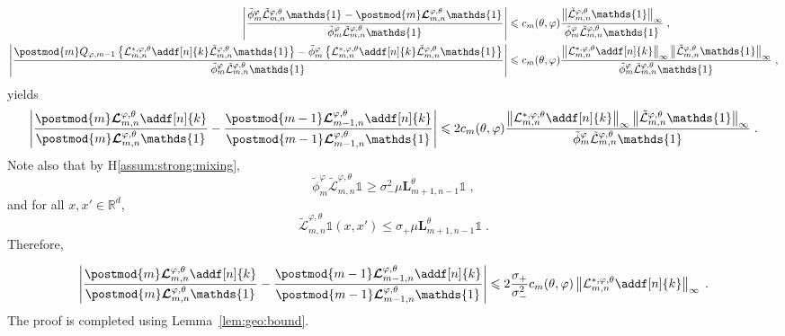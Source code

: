 \documentclass{article}
\newcommand{\precpar}{\varphi}
\newcommand{\1}{\mathbbm{1}}
\newcommand{\retrokmod}{\boldsymbol{\mathcal{L}}^{\precpar,\theta}}
\newcommand{\uk}[1]{\mathbf{L}_{#1}}
\def\1{\mathds{1}}
\newcommand{\eqsp}{\;}
\begin{document}
\begin{align*}
\left|\frac{\tilde\phi^\varphi_m\tilde{\mathcal{L}}^{\varphi,\theta}_{m, n} \1_{}-\postmod{m} \retrokmod_{m, n} \1_{}}{\tilde\phi^\varphi_m\tilde{\mathcal{L}}^{\varphi,\theta}_{m, n} \1_{}}\right|&\leqslant c_m(\theta,\varphi)\frac{\left\|\tilde{\mathcal{L}}^{\varphi,\theta}_{m, n} \1\right\|_\infty}{\tilde\phi^\varphi_m\tilde{\mathcal{L}}^{\varphi,\theta}_{m, n}\1_{}}\eqsp,\\
\left|\frac{\postmod{m} Q_{\varphi,m-1} \left\{\mathcal{L}^{*,\varphi,\theta}_{m, n} \addf[n]{k}\tilde{\mathcal{L}}^{\varphi,\theta}_{m, n} \1\right\} - \tilde\phi^\varphi_m\left\{\mathcal{L}^{*,\varphi,\theta}_{m, n} \addf[n]{k}\tilde{\mathcal{L}}^{\varphi,\theta}_{m, n} \1\right\}}{\tilde\phi^\varphi_m\tilde{\mathcal{L}}^{\varphi,\theta}_{m, n} \1_{}}\right| &\leqslant c_m(\theta,\varphi)\frac{\left\|\mathcal{L}^{*,\varphi,\theta}_{m, n} \addf[n]{k}\right\|_\infty\left\|\tilde{\mathcal{L}}^{\varphi,\theta}_{m, n} \1\right\|_\infty}{\tilde\phi^\varphi_m\tilde{\mathcal{L}}^{\varphi,\theta}_{m, n}\1_{}}\eqsp,
\end{align*}
yields
$$
\left| \frac{\postmod{m} \retrokmod_{m, n} \addf[n]{k}}{\postmod{m} \retrokmod_{m, n} \1_{}} - \frac{\postmod{m - 1} \retrokmod_{m - 1, n} \addf[n]{k}}{\postmod{m - 1} \retrokmod_{m - 1, n} \1_{}} \right|\leqslant 2c_m(\theta,\varphi)\frac{\left\|\mathcal{L}^{*,\varphi,\theta}_{m, n} \addf[n]{k}\right\|_\infty\left\|\tilde{\mathcal{L}}^{\varphi,\theta}_{m, n} \1\right\|_\infty}{\tilde\phi^\varphi_m\tilde{\mathcal{L}}^{\varphi,\theta}_{m, n}\1_{}}\eqsp.
$$
Note also that by H\ref{assum:strong:mixing},
$$
\tilde\phi^\varphi_m\tilde{\mathcal{L}}^{\varphi,\theta}_{m, n}\1_{} \geqslant \sigma_-^2 \mu  \uk{m+1, n-1}^\theta\1\eqsp,
$$ 
and for all $x,x'\in\mathbb{R}^d$,
$$
\tilde{\mathcal{L}}^{\varphi,\theta}_{m, n} \1(x,x')\leqslant  \sigma_+\mu  \uk{m+1, n-1}^\theta\1\eqsp.
$$
Therefore,

$$
\left| \frac{\postmod{m} \retrokmod_{m, n} \addf[n]{k}}{\postmod{m} \retrokmod_{m, n} \1_{}} - \frac{\postmod{m - 1} \retrokmod_{m - 1, n} \addf[n]{k}}{\postmod{m - 1} \retrokmod_{m - 1, n} \1_{}} \right|\leqslant 2\frac{\sigma_+}{\sigma_-^2}c_m(\theta,\varphi) \left\|\mathcal{L}^{*,\varphi,\theta}_{m, n} \addf[n]{k}\right\|_\infty\eqsp.
$$
The proof is completed using Lemma~\ref{lem:geo:bound}.



\end{document}
